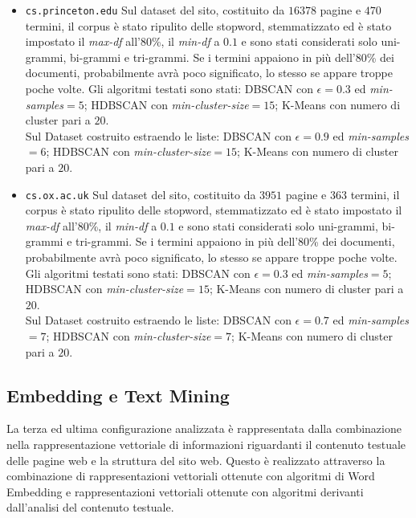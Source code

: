 \begin{itemize}
\item \texttt{cs.princeton.edu}
Sul dataset del sito, costituito da $16378$ pagine e $470$ termini, il corpus è stato ripulito delle stopword, stemmatizzato ed è stato impostato il \textit{max-df} all'80\%, il \textit{min-df} a $0.1$ e sono stati considerati solo uni-grammi, bi-grammi e tri-grammi. Se i termini appaiono in più dell'80\% dei documenti, probabilmente avrà poco significato, lo stesso se appare troppe poche volte. Gli algoritmi testati sono stati: DBSCAN con $\epsilon = 0.3$ ed \textit{min-samples}$ = 5$; HDBSCAN con \textit{min-cluster-size}$=15$; K-Means con numero di cluster pari a $20$. \\Sul Dataset costruito estraendo le liste: DBSCAN con $\epsilon = 0.9$ ed \textit{min-samples}$ = 6$; HDBSCAN con \textit{min-cluster-size}$=15$; K-Means con numero di cluster pari a $20$.  
\item \texttt{cs.ox.ac.uk}
Sul dataset del sito, costituito da $3951$ pagine e $363$ termini, il corpus è stato ripulito delle stopword, stemmatizzato ed è stato impostato il \textit{max-df} all'80\%, il \textit{min-df} a $0.1$ e sono stati considerati solo uni-grammi, bi-grammi e tri-grammi. Se i termini appaiono in più dell'80\% dei documenti, probabilmente avrà poco significato, lo stesso se appare troppe poche volte. Gli algoritmi testati sono stati: DBSCAN con $\epsilon = 0.3$ ed \textit{min-samples}$ = 5$; HDBSCAN con \textit{min-cluster-size}$=15$; K-Means con numero di cluster pari a $20$. \\Sul Dataset costruito estraendo le liste: DBSCAN con $\epsilon = 0.7$ ed \textit{min-samples}$ = 7$; HDBSCAN con \textit{min-cluster-size}$=7$; K-Means con numero di cluster pari a $20$. 
\end{itemize}

\subsection{Embedding e Text Mining}
La terza ed ultima configurazione analizzata è rappresentata dalla combinazione nella rappresentazione vettoriale di informazioni riguardanti il contenuto testuale delle pagine web e la struttura del sito web. Questo è realizzato attraverso la combinazione di rappresentazioni vettoriali ottenute con algoritmi di Word Embedding e rappresentazioni vettoriali ottenute con algoritmi derivanti dall'analisi del contenuto testuale. 

